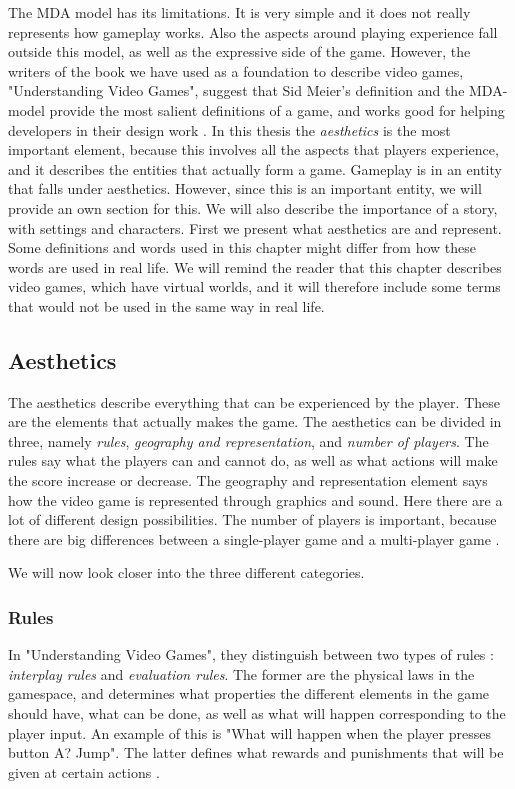 The MDA model has its limitations. It is very simple and it does not really represents how gameplay works. Also the aspects around playing experience fall outside this model, as well as the expressive side of the game. However, the writers of the book we have used as a foundation to describe video games, "Understanding Video Games", suggest that Sid Meier's definition and the MDA-model provide the most salient definitions of a game, and works good for helping developers in their design work \cite{understandingvg}. In this thesis the \emph{aesthetics} is the most important element, because this involves all the aspects that players experience, and it describes the entities that actually form a game. Gameplay is in \cite{understandingvg} an entity that falls under aesthetics. However, since this is an important entity, we will provide an own section for this. We will also describe the importance of a story, with settings and characters. First we present what aesthetics are and represent. Some definitions and words used in this chapter might differ from how these words are used in real life. We will remind the reader that this chapter describes video games, which have virtual worlds, and it will therefore include some terms that would not be used in the same way in real life.    


\subsection{Aesthetics}
The aesthetics describe everything that can be experienced by the player. These are the elements that actually makes the game. The aesthetics can be divided in three, namely \emph{rules}, \emph{geography and representation}, and \emph{number of players}. The rules say what the players can and cannot do, as well as what actions will make the score increase or decrease. The geography and representation element says how the video game is represented through graphics and sound. Here there are a lot of different design possibilities. The number of players is important, because there are big differences between a single-player game and a multi-player game \cite{understandingvg}.

We will now look closer into the three different categories.

\subsubsection{Rules}
In "Understanding Video Games", they distinguish between two types of rules  \cite{understandingvg}: \emph{interplay rules} and \emph{evaluation rules}. The former are the physical laws in the gamespace, and determines what properties the different elements in the game should have, what can be done, as well as what will happen corresponding to the player input. An example of this is "What will happen when the player presses button A? Jump". The latter defines what rewards and punishments that will be given at certain actions \cite{understandingvg}. 

